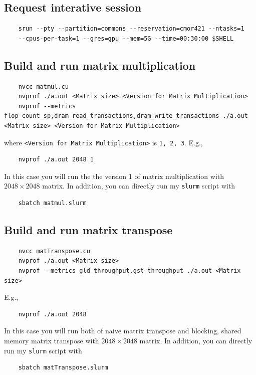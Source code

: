 \documentclass[11pt]{article}
\begin{document}
\subsection{Request interative session}
\begin{verbatim}
    srun --pty --partition=commons --reservation=cmor421 --ntasks=1
    --cpus-per-task=1 --gres=gpu --mem=5G --time=00:30:00 $SHELL
\end{verbatim}

\subsection{Build and run matrix multiplication}
\begin{verbatim}
    nvcc matmul.cu
    nvprof ./a.out <Matrix size> <Version for Matrix Multiplication>
    nvprof --metrics flop_count_sp,dram_read_transactions,dram_write_transactions ./a.out <Matrix size> <Version for Matrix Multiplication>

\end{verbatim}
where \verb|<Version for Matrix Multiplication>| is \verb|1, 2, 3|. E.g., 
\begin{verbatim}
    nvprof ./a.out 2048 1
\end{verbatim}
    
In this case you will run the the version 1 of matrix multiplication with $2048 \times 2048$ matrix. In addition, you can directly run my \verb|slurm| script with
\begin{verbatim}
    sbatch matmul.slurm
\end{verbatim}

\subsection{Build and run matrix transpose}
\begin{verbatim}
    nvcc matTranspose.cu
    nvprof ./a.out <Matrix size>
    nvprof --metrics gld_throughput,gst_throughput ./a.out <Matrix size>

\end{verbatim}
E.g., 
\begin{verbatim}
    nvprof ./a.out 2048
\end{verbatim}
In this case you will run both of naive matrix transpose and blocking, shared memory matrix transpose with $2048 \times 2048$ matrix. In addition, you can directly run my \verb|slurm| script with
\begin{verbatim}
    sbatch matTranspose.slurm
\end{verbatim}
\end{document}
